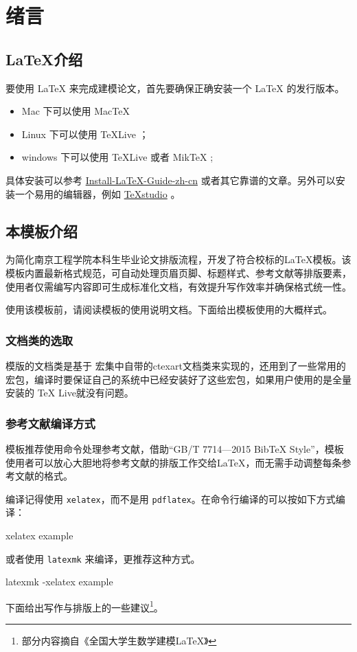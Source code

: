 
\section{绪言}

\subsection{\LaTeX 介绍}

要使用 \LaTeX{} 来完成建模论文，首先要确保正确安装一个 \LaTeX{} 的发行版本。

\begin{itemize}
    \item Mac 下可以使用 Mac\TeX{}
    \item Linux 下可以使用 \TeX{}Live ；
    \item windows 下可以使用 \TeX{}Live 或者 Mik\TeX{} ;
\end{itemize}

具体安装可以参考 \href{https://github.com/OsbertWang/install-latex-guide-zh-cn/releases/}{Install-LaTeX-Guide-zh-cn} 或者其它靠谱的文章。另外可以安装一个易用的编辑器，例如 \href{https://mirrors.tuna.tsinghua.edu.cn/github-release/texstudio-org/texstudio/LatestRelease/}{\TeX{}studio} 。


\subsection{本模板介绍}

为简化南京工程学院本科生毕业论文排版流程，开发了符合校标的LaTeX模板。该模板内置最新格式规范，可自动处理页眉页脚、标题样式、参考文献等排版要素，使用者仅需编写内容即可生成标准化文档，有效提升写作效率并确保格式统一性。

使用该模板前，请阅读模板的使用说明文档。下面给出模板使用的大概样式。

\subsubsection{文档类的选取}

模版的文档类是基于\CTeX{} 宏集中自带的ctexart文档类来实现的\cite{x5}，还用到了一些常用的宏包，编译时要保证自己的系统中已经安装好了这些宏包，如果用户使用的是全量安装的 TeX Live就没有问题。

\subsubsection{参考文献编译方式}

模板推荐使用\verb||命令处理参考文献，借助“GB/T 7714—2015 BibTeX Style”\cite{x6}，模板使用者可以放心大胆地将参考文献的排版工作交给\LaTeX ，而无需手动调整每条参考文献的格式。

编译记得使用 \verb|xelatex|，而不是用 \verb|pdflatex|。在命令行编译的可以按如下方式编译：
\begin{tcode}
	xelatex example
\end{tcode}
或者使用 \verb|latexmk| 来编译，更推荐这种方式。
\begin{tcode}
	latexmk -xelatex example
\end{tcode}

下面给出写作与排版上的一些建议\footnote{部分内容摘自《全国大学生数学建模\LaTeX》}。